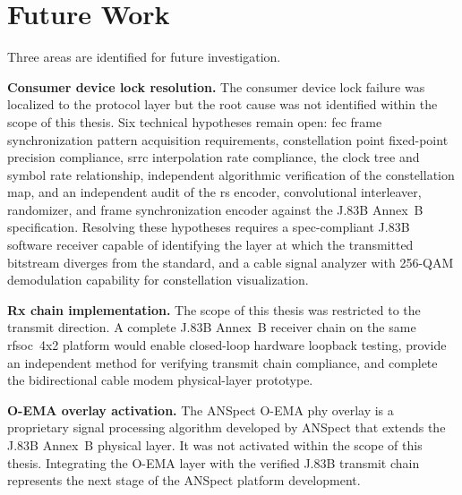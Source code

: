 \section{Future Work}
\label{sec:future_work}

Three areas are identified for future investigation.

\textbf{Consumer device lock resolution.}
The consumer device lock failure was localized to the protocol
layer but the root cause was not identified within the scope
of this thesis.
Six technical hypotheses remain open: \ac{fec} frame
synchronization pattern acquisition requirements, constellation
point fixed-point precision compliance, \ac{srrc} interpolation
rate compliance, the clock tree and symbol rate relationship,
independent algorithmic verification of the constellation map,
and an independent audit of the \ac{rs} encoder, convolutional
interleaver, randomizer, and frame synchronization encoder
against the J.83B Annex~B specification.
Resolving these hypotheses requires a spec-compliant J.83B
software receiver capable of identifying the layer at which
the transmitted bitstream diverges from the standard, and a
cable signal analyzer with 256-QAM demodulation capability
for constellation visualization.

\textbf{Rx chain implementation.}
The scope of this thesis was restricted to the transmit
direction.
A complete J.83B Annex~B receiver chain on the same
\ac{rfsoc}~4x2 platform would enable closed-loop hardware
loopback testing, provide an independent method for
verifying transmit chain compliance, and complete the
bidirectional cable modem physical-layer prototype.

\textbf{O-EMA overlay activation.}
The ANSpect O-EMA \ac{phy} overlay is a proprietary
signal processing algorithm developed by ANSpect that
extends the J.83B Annex~B physical layer.
It was not activated within the scope of this thesis.
Integrating the O-EMA layer with the verified J.83B transmit
chain represents the next stage of the ANSpect platform
development.